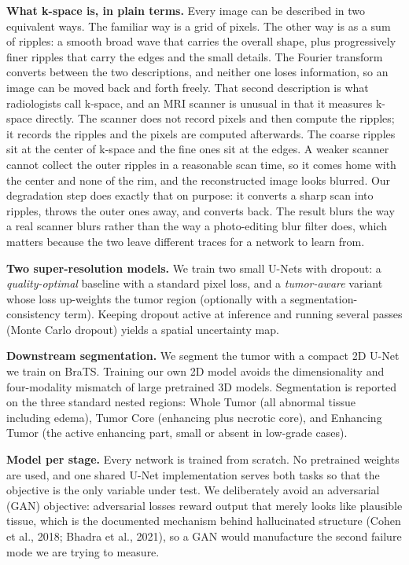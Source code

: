 \documentclass[11pt,a4paper]{article}
\begin{document}
\textbf{What k-space is, in plain terms.} Every image can be described in two equivalent ways. The familiar way is a grid of pixels. The other way is as a sum of ripples: a smooth broad wave that carries the overall shape, plus progressively finer ripples that carry the edges and the small details. The Fourier transform converts between the two descriptions, and neither one loses information, so an image can be moved back and forth freely. That second description is what radiologists call k-space, and an MRI scanner is unusual in that it measures k-space directly. The scanner does not record pixels and then compute the ripples; it records the ripples and the pixels are computed afterwards. The coarse ripples sit at the center of k-space and the fine ones sit at the edges. A weaker scanner cannot collect the outer ripples in a reasonable scan time, so it comes home with the center and none of the rim, and the reconstructed image looks blurred. Our degradation step does exactly that on purpose: it converts a sharp scan into ripples, throws the outer ones away, and converts back. The result blurs the way a real scanner blurs rather than the way a photo-editing blur filter does, which matters because the two leave different traces for a network to learn from.

\textbf{Two super-resolution models.} We train two small U-Nets with dropout: a \textit{quality-optimal} baseline with a standard pixel loss, and a \textit{tumor-aware} variant whose loss up-weights the tumor region (optionally with a segmentation-consistency term). Keeping dropout active at inference and running several passes (Monte Carlo dropout) yields a spatial uncertainty map.

\textbf{Downstream segmentation.} We segment the tumor with a compact 2D U-Net we train on BraTS. Training our own 2D model avoids the dimensionality and four-modality mismatch of large pretrained 3D models. Segmentation is reported on the three standard nested regions: Whole Tumor (all abnormal tissue including edema), Tumor Core (enhancing plus necrotic core), and Enhancing Tumor (the active enhancing part, small or absent in low-grade cases).

\textbf{Model per stage.} Every network is trained from scratch. No pretrained weights are used, and one shared U-Net implementation serves both tasks so that the objective is the only variable under test. We deliberately avoid an adversarial (GAN) objective: adversarial losses reward output that merely looks like plausible tissue, which is the documented mechanism behind hallucinated structure (Cohen et al., 2018; Bhadra et al., 2021), so a GAN would manufacture the second failure mode we are trying to measure.
\end{document}

